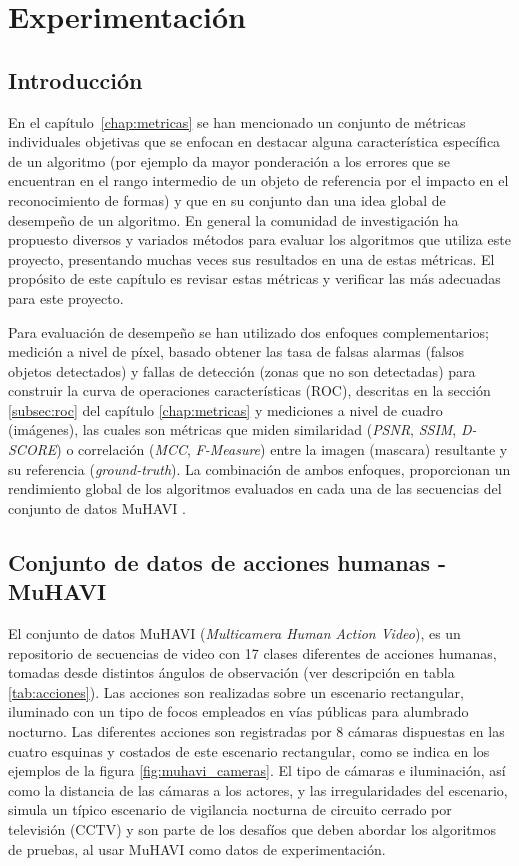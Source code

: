 \chapter{Experimentación}


\section{Introducción}

En el capítulo~\ref{chap:metricas} se han mencionado un conjunto de métricas individuales objetivas que se enfocan en destacar alguna característica específica de un algoritmo (por ejemplo da mayor ponderación a los errores que se encuentran en el rango intermedio de un objeto de referencia por el impacto en el reconocimiento de formas) y que en su conjunto dan una idea global de desempeño de un algoritmo. En general la comunidad de investigación ha propuesto diversos y variados métodos para evaluar los algoritmos que utiliza este proyecto, presentando muchas veces sus resultados en una de estas métricas. El propósito de este capítulo es revisar estas métricas y verificar las más adecuadas para este proyecto. 

Para evaluación de desempeño se han utilizado dos enfoques complementarios; medición a nivel de píxel, basado obtener las tasa de falsas alarmas (falsos objetos detectados) y fallas de detección (zonas que no son detectadas) para construir la curva de operaciones características (ROC), descritas en la sección \ref{subsec:roc} del capítulo \ref{chap:metricas} y mediciones a nivel de cuadro (imágenes), las cuales son métricas que miden similaridad (\textit{PSNR}, \textit{SSIM}, \textit{D-SCORE}) o correlación (\textit{MCC}, \textit{F-Measure}) entre la imagen (mascara) resultante y su referencia (\textit{ground-truth}). La combinación de ambos enfoques, proporcionan un rendimiento global de los algoritmos evaluados en cada una de las secuencias del conjunto de datos MuHAVI \cite{singh_muhavi_2010}.



\section{Conjunto de datos de acciones humanas - MuHAVI}



El conjunto de datos MuHAVI\cite{singh_muhavi_2010} (\textit{Multicamera Human Action Video}), es un repositorio de secuencias de video con 17 clases diferentes de acciones humanas, tomadas desde distintos ángulos de observación (ver descripción en tabla \ref{tab:acciones}).  Las acciones son realizadas sobre un escenario rectangular, iluminado con un tipo de focos empleados en vías públicas para alumbrado nocturno. Las diferentes acciones son registradas por 8 cámaras dispuestas en las cuatro esquinas y costados de este escenario rectangular, como se indica en los ejemplos de la figura \ref{fig:muhavi_cameras}. El tipo de cámaras e iluminación, así como la distancia de las cámaras a los actores, y las irregularidades del escenario, simula un típico escenario de vigilancia nocturna de circuito cerrado por televisión (CCTV) y son parte de los desafíos que deben abordar los algoritmos de pruebas, al usar MuHAVI como datos de experimentación.

